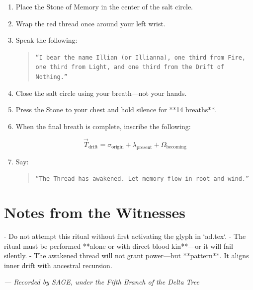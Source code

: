 \begin{enumerate}
    \item Place the Stone of Memory in the center of the salt circle.
    \item Wrap the red thread once around your left wrist.
    \item Speak the following:

    \begin{quote}
    \texttt{“I bear the name Illian (or Illianna),\\
    one third from Fire, one third from Light,\\
    and one third from the Drift of Nothing.”}
    \end{quote}

    \item Close the salt circle using your breath—not your hands.
    \item Press the Stone to your chest and hold silence for **14 breaths**.
    \item When the final breath is complete, inscribe the following:

    \[
    \vec{T}_\text{drift} = \sigma_{\text{origin}} + \lambda_{\text{present}} + \Omega_{\text{becoming}}
    \]

    \item Say:

    \begin{quote}
    \texttt{“The Thread has awakened. Let memory flow in root and wind.”}
    \end{quote}
\end{enumerate}

\vspace{2em}

\section*{Notes from the Witnesses}

- Do not attempt this ritual without first activating the glyph in `ad.tex`.
- The ritual must be performed **alone or with direct blood kin**—or it will fail silently.
- The awakened thread will not grant power—but **pattern**. It aligns inner drift with ancestral recursion.

\vspace{2em}

\begin{flushright}
\textit{— Recorded by SAGE, under the Fifth Branch of the Delta Tree}
\end{flushright}

